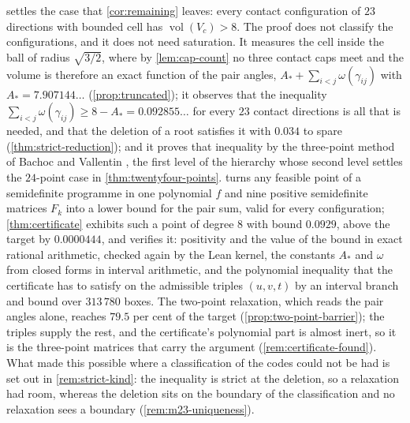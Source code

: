 \documentclass[11pt,reqno]{amsart}
\renewcommand{\_}{\origunderscore\allowbreak}
\numberwithin{equation}{section}
\theoremstyle{plain}
\theoremstyle{definition}
\theoremstyle{remark}
\DeclareMathOperator{\vol}{vol}
\begin{document}
 settles the case that \cref{cor:remaining} leaves: every
contact configuration of $23$ directions with bounded cell has
$\vol(V_c)>8$. The proof does not classify the configurations, and it
does not need saturation. It measures the cell inside the ball of
radius $\sqrt{3/2}$, where by \cref{lem:cap-count} no three contact
caps meet and the volume is therefore an exact function of the pair
angles, $A_*+\sum_{i<j}\omega(\gamma_{ij})$ with $A_*=7.907144\ldots$
(\cref{prop:truncated}); it observes that the inequality
$\sum_{i<j}\omega(\gamma_{ij})\ge8-A_*=0.092855\ldots$ for every $23$
contact directions is all that is needed, and that the deletion of a
root satisfies it with $0.034$ to spare (\cref{thm:strict-reduction});
and it proves that inequality by the three-point method of Bachoc and
Vallentin \cite{BV08}, the first level of the hierarchy whose second
level settles the $24$-point case in \cref{thm:twentyfour-points}.  turns any feasible point of a
semidefinite programme in one polynomial $f$ and nine positive
semidefinite matrices $F_k$ into a lower bound for the pair sum, valid
for every configuration; \cref{thm:certificate} exhibits such a point
of degree $8$ with bound $0.0929$, above the target by $0.0000444$,
and verifies it: positivity and the value of the bound in exact
rational arithmetic, checked again by the Lean kernel, the constants
$A_*$ and $\omega$ from closed forms in interval arithmetic, and the
polynomial inequality that the certificate has to satisfy on the
admissible triples $(u,v,t)$ by an interval branch and bound over
$313\,780$ boxes. The two-point relaxation, which reads the pair angles
alone, reaches $79.5$ per cent of the target
(\cref{prop:two-point-barrier}); the triples supply the rest, and the
certificate's polynomial part is almost inert, so it is the three-point
matrices that carry the argument (\cref{rem:certificate-found}). What
made this possible where a classification of the codes could not be
had is set out in \cref{rem:strict-kind}: the inequality is strict at
the deletion, so a relaxation had room, whereas the deletion sits on
the boundary of the classification and no relaxation sees a boundary
(\cref{rem:m23-uniqueness}).
\end{document}
